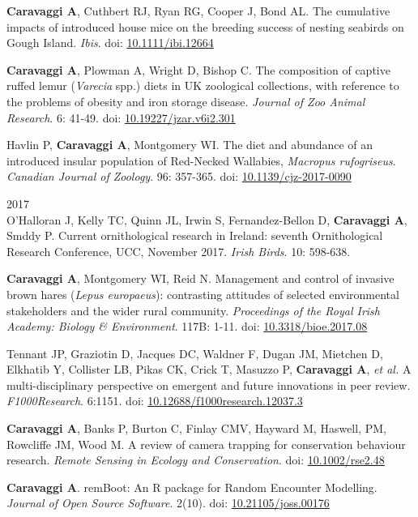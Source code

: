 \documentclass[]{article}
\begin{document}
\textbf{Caravaggi A}, Cuthbert RJ, Ryan RG, Cooper J, Bond AL. The
cumulative impacts of introduced house mice on the breeding success of
nesting seabirds on Gough Island. \emph{Ibis}. doi:
\href{https://onlinelibrary.wiley.com/doi/10.1111/ibi.12664}{10.1111/ibi.12664}

\textbf{Caravaggi A}, Plowman A, Wright D, Bishop C. The composition of
captive ruffed lemur (\emph{Varecia} spp.) diets in UK zoological
collections, with reference to the problems of obesity and iron storage
disease. \emph{Journal of Zoo Animal Research}. 6: 41-49. doi:
\href{https://doi.org/10.19227/jzar.v6i2.301}{10.19227/jzar.v6i2.301}

Havlin P, \textbf{Caravaggi A}, Montgomery WI. The diet and abundance of
an introduced insular population of Red-Necked Wallabies, \emph{Macropus
rufogriseus}. \emph{Canadian Journal of Zoology}. 96: 357-365. doi:
\url{10.1139/cjz-2017-0090}

2017\\
O'Halloran J, Kelly TC, Quinn JL, Irwin S, Fernandez-Bellon D,
\textbf{Caravaggi A}, Smddy P. Current ornithological research in
Ireland: seventh Ornithological Research Conference, UCC, November 2017.
\emph{Irish Birds}. 10: 598-638.

\textbf{Caravaggi A}, Montgomery WI, Reid N. Management and control of
invasive brown hares (\emph{Lepus europaeus}): contrasting attitudes of
selected environmental stakeholders and the wider rural community.
\emph{Proceedings of the Royal Irish Academy: Biology \& Environment}.
117B: 1-11. doi:
\href{http://www.jstor.org/stable/10.3318/bioe.2017.08}{10.3318/bioe.2017.08}

Tennant JP, Graziotin D, Jacques DC, Waldner F, Dugan JM, Mietchen D,
Elkhatib Y, Collister LB, Pikas CK, Crick T, Masuzzo P,
\textbf{Caravaggi A}, \emph{et al.} A multi-disciplinary perspective on
emergent and future innovations in peer review. \emph{F1000Research}.
6:1151. doi:
\href{https://f1000research.com/articles/6-1151/v3}{10.12688/f1000research.12037.3}

\textbf{Caravaggi A}, Banks P, Burton C, Finlay CMV, Hayward M, Haswell,
PM, Rowcliffe JM, Wood M. A review of camera trapping for conservation
behaviour research. \emph{Remote Sensing in Ecology and Conservation}.
doi:
\href{http://onlinelibrary.wiley.com/doi/10.1002/rse2.48/abstract}{10.1002/rse2.48}

\textbf{Caravaggi A}. remBoot: An R package for Random Encounter
Modelling. \emph{Journal of Open Source Software}. 2(10). doi:
\href{http://joss.theoj.org/papers/10.21105/joss.00176}{10.21105/joss.00176}
\end{document}
